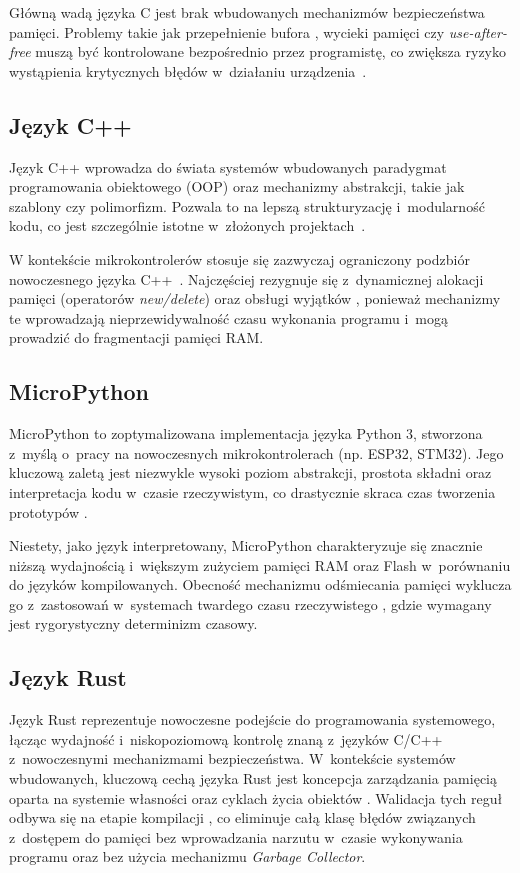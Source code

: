 Główną wadą języka C jest brak wbudowanych mechanizmów bezpieczeństwa 
pamięci. Problemy takie jak przepełnienie bufora 
, wycieki pamięci 
 czy \textit{use-after-free} 
muszą być kontrolowane bezpośrednio przez programistę, co zwiększa 
ryzyko wystąpienia krytycznych błędów w~działaniu 
urządzenia~\cite{Seacord2013SecureCoding}.

\subsection{Język C++}
Język C++ wprowadza do świata systemów wbudowanych paradygmat 
programowania obiektowego (OOP) oraz mechanizmy abstrakcji, takie 
jak szablony  czy polimorfizm. 
Pozwala to na lepszą strukturyzację i~modularność kodu, co jest 
szczególnie istotne w~złożonych projektach~\cite{cppreference-cpp}. 

W kontekście mikrokontrolerów stosuje się zazwyczaj ograniczony 
podzbiór nowoczesnego języka C++~\cite{AUTOSAR_CPP14_2017}. Najczęściej rezygnuje się 
z~dynamicznej alokacji pamięci (operatorów \textit{new/delete}) 
oraz obsługi wyjątków , ponieważ mechanizmy 
te wprowadzają nieprzewidywalność czasu wykonania programu 
i~mogą prowadzić do fragmentacji pamięci RAM.

\subsection{MicroPython}
MicroPython to zoptymalizowana implementacja języka Python 3, 
stworzona z~myślą o~pracy na nowoczesnych mikrokontrolerach 
(np. ESP32, STM32). Jego kluczową zaletą jest niezwykle wysoki poziom 
abstrakcji, prostota składni oraz interpretacja kodu w~czasie 
rzeczywistym, co drastycznie skraca czas tworzenia prototypów
\cite{micropython_github}.

Niestety, jako język interpretowany, MicroPython charakteryzuje się 
znacznie niższą wydajnością i~większym zużyciem pamięci RAM oraz Flash 
w~porównaniu do języków kompilowanych. Obecność mechanizmu 
odśmiecania pamięci  wyklucza go 
z~zastosowań w~systemach twardego czasu rzeczywistego 
, 
gdzie wymagany jest rygorystyczny determinizm czasowy.

\subsection{Język Rust}
Język Rust reprezentuje nowoczesne podejście do programowania 
systemowego, łącząc wydajność i~niskopoziomową kontrolę znaną 
z~języków C/C++ z~nowoczesnymi mechanizmami bezpieczeństwa. 
W~kontekście systemów wbudowanych, kluczową cechą języka Rust jest 
koncepcja zarządzania pamięcią oparta na systemie własności 
 oraz cyklach życia obiektów 
. Walidacja tych reguł odbywa się na etapie 
kompilacji , co eliminuje całą klasę 
błędów związanych z~dostępem do pamięci bez wprowadzania narzutu 
w~czasie wykonywania programu oraz bez użycia mechanizmu 
\textit{Garbage Collector}.

